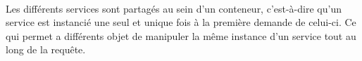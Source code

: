 \paragraph{}
Les différents services sont partagés au sein d'un conteneur, c'est-à-dire qu'un service est instancié une seul et unique fois à la première demande de celui-ci. Ce qui permet a  différents objet de manipuler la même instance d'un service tout au long de la requête.
